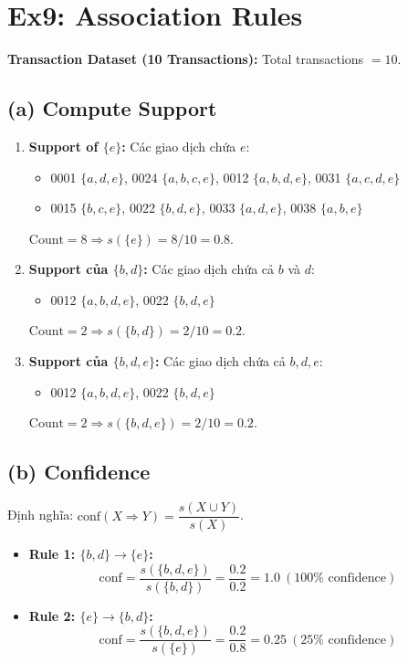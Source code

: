 \section{Ex9: Association Rules}

\textbf{Transaction Dataset (10 Transactions):} Total transactions $= 10$.

\subsection*{(a) Compute Support}
\begin{enumerate}
    \item \textbf{Support of $\{e\}$:} Các giao dịch chứa $e$:
    \begin{itemize}
        \item 0001 $\{a, d, e\}$, 0024 $\{a, b, c, e\}$, 0012 $\{a, b, d, e\}$, 0031 $\{a, c, d, e\}$
        \item 0015 $\{b, c, e\}$, 0022 $\{b, d, e\}$, 0033 $\{a, d, e\}$, 0038 $\{a, b, e\}$
    \end{itemize}
    $\text{Count} = 8 \Rightarrow s(\{e\}) = 8/10 = 0.8$.

    \item \textbf{Support của $\{b, d\}$:} Các giao dịch chứa cả $b$ và $d$:
    \begin{itemize}
        \item 0012 $\{a, b, d, e\}$, 0022 $\{b, d, e\}$
    \end{itemize}
    $\text{Count} = 2 \Rightarrow s(\{b, d\}) = 2/10 = 0.2$.

    \item \textbf{Support của $\{b, d, e\}$:} Các giao dịch chứa cả $b, d, e$:
    \begin{itemize}
        \item 0012 $\{a, b, d, e\}$, 0022 $\{b, d, e\}$
    \end{itemize}
    $\text{Count} = 2 \Rightarrow s(\{b, d, e\}) = 2/10 = 0.2$.
\end{enumerate}

\subsection*{(b) Confidence}
Định nghĩa: $\text{conf}(X \Rightarrow Y) = \dfrac{s(X \cup Y)}{s(X)}$.
\begin{itemize}
    \item \textbf{Rule 1: $\{b, d\} \rightarrow \{e\}$:}
    $$\text{conf} = \frac{s(\{b, d, e\})}{s(\{b, d\})} = \frac{0.2}{0.2} = 1.0 \ (100\% \text{ confidence})$$
    \item \textbf{Rule 2: $\{e\} \rightarrow \{b, d\}$:}
    $$\text{conf} = \frac{s(\{b, d, e\})}{s(\{e\})} = \frac{0.2}{0.8} = 0.25 \ (25\% \text{ confidence})$$
\end{itemize}

